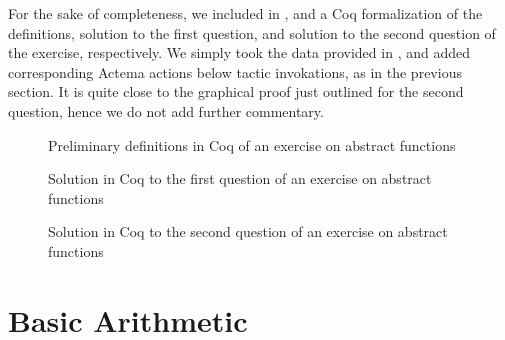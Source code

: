 For the sake of completeness, we included in ,
 and  a Coq formalization of the
definitions, solution to the first question, and solution to the second question
of the exercise, respectively. We simply took the data provided in
\cite{bartzia_proof_nodate}, and added corresponding Actema actions below tactic
invokations, as in the previous section. It is quite close to the graphical proof
just outlined for the second question, hence we do not add further commentary.

\begin{figure}
  
  \caption{Preliminary definitions in Coq of an exercise on abstract functions}
\end{figure}

\begin{figure}
  
  \caption{Solution in Coq to the first question of an exercise on abstract functions}
\end{figure}

\begin{figure}
  
  \caption{Solution in Coq to the second question of an exercise on abstract functions}
\end{figure}

\section{Basic Arithmetic}

